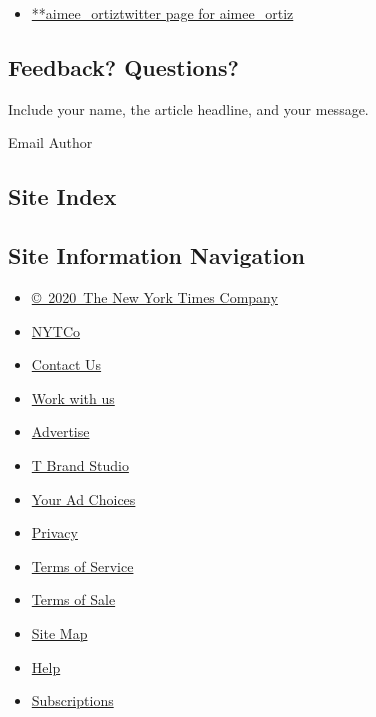 \begin{itemize}
\tightlist
\item
  \href{https://twitter.com/aimee_ortiz}{**aimee\_ortiztwitter page for
  aimee\_ortiz}
\end{itemize}

\hypertarget{feedback-questions}{%
\subsection{Feedback? Questions?}\label{feedback-questions}}

Include your name, the article headline, and your message.

Email Author

\hypertarget{site-index}{%
\subsection{Site Index}\label{site-index}}

\hypertarget{site-information-navigation}{%
\subsection{Site Information
Navigation}\label{site-information-navigation}}

\begin{itemize}
\tightlist
\item
  \href{https://help.nytimes3xbfgragh.onion/hc/en-us/articles/115014792127-Copyright-notice}{©~2020~The
  New York Times Company}
\end{itemize}

\begin{itemize}
\tightlist
\item
  \href{https://www.nytco.com/}{NYTCo}
\item
  \href{https://help.nytimes3xbfgragh.onion/hc/en-us/articles/115015385887-Contact-Us}{Contact
  Us}
\item
  \href{https://www.nytco.com/careers/}{Work with us}
\item
  \href{https://nytmediakit.com/}{Advertise}
\item
  \href{http://www.tbrandstudio.com/}{T Brand Studio}
\item
  \href{https://www.nytimes3xbfgragh.onion/privacy/cookie-policy\#how-do-i-manage-trackers}{Your
  Ad Choices}
\item
  \href{https://www.nytimes3xbfgragh.onion/privacy}{Privacy}
\item
  \href{https://help.nytimes3xbfgragh.onion/hc/en-us/articles/115014893428-Terms-of-service}{Terms
  of Service}
\item
  \href{https://help.nytimes3xbfgragh.onion/hc/en-us/articles/115014893968-Terms-of-sale}{Terms
  of Sale}
\item
  \href{https://spiderbites.nytimes3xbfgragh.onion}{Site Map}
\item
  \href{https://help.nytimes3xbfgragh.onion/hc/en-us}{Help}
\item
  \href{https://www.nytimes3xbfgragh.onion/subscription?campaignId=37WXW}{Subscriptions}
\end{itemize}
